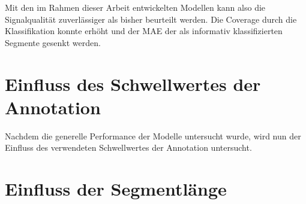  Mit den im Rahmen dieser Arbeit entwickelten Modellen kann also die Signalqualität zuverlässiger als bisher beurteilt werden. Die Coverage durch die Klassifikation konnte erhöht und der \ac{MAE} der als informativ klassifizierten Segmente gesenkt werden.

\section{Einfluss des Schwellwertes der Annotation}

Nachdem die generelle Performance der Modelle untersucht wurde, wird nun der Einfluss des verwendeten Schwellwertes der Annotation untersucht.

\section{Einfluss der Segmentlänge}



